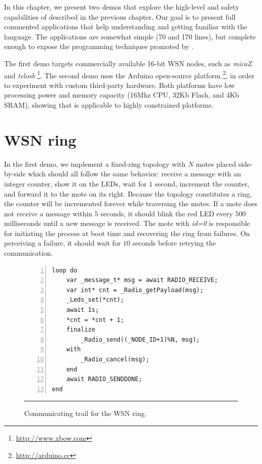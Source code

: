 In this chapter, we present two demos that explore the high-level and safety 
capabilities of \CEU described in the previous chapter.
%
Our goal is to present full commented applications that help understanding and 
getting familiar with the language.
%
The applications are somewhat simple (70 and 170 lines), but complete enough to 
expose the programming techniques promoted by \CEU.

The first demo targets commercially available 16-bit WSN nodes, such as 
\emph{micaZ} and \emph{telosb}%
\footnote{\url{http://www.xbow.com}}.
The second demo uses the Arduino open-source platform%
\footnote{\url{http://arduino.cc}}, in order to experiment with custom
third-party hardware.
Both platforms have low processing power and memory capacity (16Mhz CPU, 32Kb 
Flash, and 4Kb SRAM), showing that \CEU is applicable to highly constrained 
platforms.

\section{WSN ring}
\label{sec:demos:ring}

In the first demo, we implement a fixed-ring topology with $N$ motes placed 
side-by-side which should all follow the same behavior: receive a message with 
an integer counter, show it on the LEDs, wait for $1$ second, increment the 
counter, and forward it to the mote on its right.
%
Because the topology constitutes a ring, the counter will be incremented 
forever while traversing the motes.
%
If a mote does not receive a message within $5$ seconds, it should blink the 
red LED every $500$ milliseconds until a new message is received.
%
The mote with \emph{id=0} is responsible for initiating the process at boot 
time and recovering the ring from failures.
On perceiving a failure, it should wait for $10$ seconds before retrying the 
communication.

\begin{figure}[ht]
\begin{lstlisting}[numbers=left,xleftmargin=2em]
loop do
    var _message_t* msg = await RADIO_RECEIVE;
    var int* cnt = _Radio_getPayload(msg);
    _Leds_set(*cnt);
    await 1s;
    *cnt = *cnt + 1;
    finalize
        _Radio_send((_NODE_ID+1)%N, msg);
    with
        _Radio_cancel(msg);
    end
    await RADIO_SENDDONE;
end
\end{lstlisting}
\rule{14cm}{0.37pt}
\caption{ Communicating trail for the WSN ring.%
{\small %
}%
\label{lst.ring.1}
}
\end{figure}

